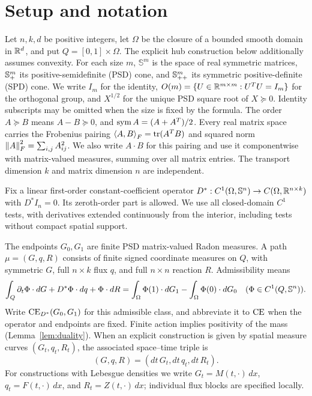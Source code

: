 \section{Setup and notation}\label{sec:setup}
Let $n,k,d$ be positive integers, let $\Omega$ be the closure of a bounded
smooth domain in $\mathbb R^d$, and put
$Q=[0,1]\times\Omega$. The explicit hub construction below additionally
assumes convexity. For each size $m$, $\mathbb S^m$ is the space of real
symmetric matrices, $\mathbb S_+^m$ its positive-semidefinite (PSD) cone, and
$\mathbb S_{++}^m$ its symmetric positive-definite (SPD) cone. We write $I_m$ for
the identity, $O(m)=\{U\in\mathbb R^{m\times m}:U^TU=I_m\}$ for the orthogonal
group, and $X^{1/2}$ for the unique PSD square root of $X\succeq0$.
Identity subscripts may be omitted when the size is fixed by the formula.
The order $A\succeq B$ means $A-B\succeq0$, and $\operatorname{sym} A=(A+A^T)/2$.
Every real matrix space carries the Frobenius pairing
$\left\langle A,B\right\rangle_F=\operatorname{tr}(A^TB)$ and squared norm $\left\lVert A\right\rVert_F^2=\sum_{i,j}A_{ij}^2$.
We also write $A\cdot B$ for this pairing and use it componentwise with
matrix-valued measures, summing over all matrix entries.
The transport dimension $k$ and matrix dimension $n$ are independent.

Fix a linear first-order constant-coefficient operator
$D^*:C^1(\Omega,\mathbb S^n)\to C(\Omega,\mathbb R^{n\times k})$ with $D^*I_n=0$.
Its zeroth-order part is allowed. We use all closed-domain $C^1$ tests,
with derivatives extended continuously from the interior, including tests
without compact spatial support.

The endpoints $G_0,G_1$ are finite PSD matrix-valued Radon measures.
A path $\mu=(G,q,R)$ consists of finite signed coordinate measures on $Q$,
with symmetric $G$, full $n\times k$ flux $q$, and full $n\times n$ reaction
$R$. Admissibility means
\begin{equation}\label{eq:ce}
 \int_Q\partial_t\Phi\cdot dG+D^*\Phi\cdot dq+\Phi\cdot dR
 =\int_\Omega\Phi(1)\cdot dG_1-\int_\Omega\Phi(0)\cdot dG_0
 \quad(\Phi\in C^1(Q,\mathbb S^n)).
\end{equation}
Write $\operatorname{CE}_{D^*}(G_0,G_1)$ for this admissible class, and abbreviate it to
$\operatorname{CE}$ when the operator and endpoints are fixed. Finite action implies
positivity of the mass (Lemma~\ref{lem:duality}).
When an explicit construction is given by spatial measure curves
$(G_t,q_t,R_t)$, the associated space--time triple is
\[
 (G,q,R)=(dt\,G_t,dt\,q_t,dt\,R_t).
\]
For constructions with Lebesgue densities we write
$G_t=M(t,\cdot)\,dx$, $q_t=F(t,\cdot)\,dx$, and
$R_t=Z(t,\cdot)\,dx$; individual flux blocks are specified locally.

